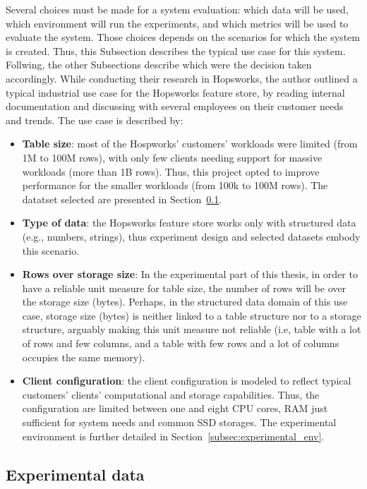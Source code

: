 Several choices must be made for a system evaluation: which data will be used, which environment will run the experiments, and which metrics will be used to evaluate the system. Those choices depends on the scenarios for which the system is created. Thus, this Subsection describes the typical use case for this system. Follwing, the other Subsections describe which were the decision taken accordingly. While conducting their research in Hopsworks, the author outlined a typical industrial use case for the Hopsworks feature store, by reading internal documentation and discussing with several employees on their customer needs and trends. The use case is described by:
\begin{itemize}  
  \item \textbf{Table size}: most of the Hospworks' customers' workloads were limited (from 1M to 100M rows), with only few clients needing support for massive workloads (more than 1B rows). Thus, this project opted to improve performance for the smaller workloads (from 100k to 100M rows). The datatset selected are presented in Section~\ref{subsec:experimental_data}.
  \item \textbf{Type of data}: the Hopsworks feature store works only with structured data (e.g., numbers, strings), thus experiment design and selected datasets embody this scenario.
  \item \textbf{Rows over storage size}: In the experimental part of this thesis, in order to have a reliable unit measure for table size, the number of rows will be over the storage size (bytes). Perhaps, in the structured data domain of this use case, storage size (bytes) is neither linked to a table structure nor to a storage structure, arguably making this unit measure not reliable (i.e, table with a lot of rows and few columns, and a table with few rows and a lot of columns occupies the same memory).
  \item \textbf{Client configuration}: the client configuration is modeled to reflect typical customers' clients' computational and storage capabilities. Thus, the configuration are limited between one and eight \gls{CPU} cores, \gls{RAM} just sufficient for system needs and common \gls{SSD} storages. The experimental environment is further detailed in Section~\ref{subsec:experimental_env}.
\end{itemize}



\subsection{Experimental data}
\label{subsec:experimental_data}

